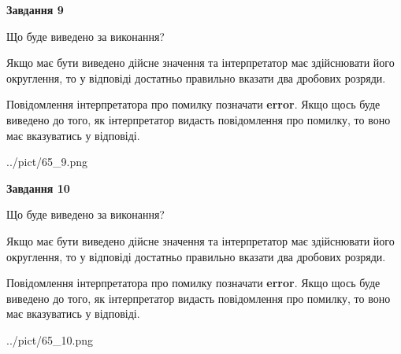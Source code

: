 \documentclass[12pt, ukrainian]{article}
\begin{document}
{\begin {Large}
{\begin {center}\textbf{Завдання 9}\end {center}}\par
Що буде виведено за виконання? \par

Якщо має бути виведено дійсне значення та інтерпретатор має здійснювати його округлення, 
то у відповіді достатньо правильно вказати два дробових розряди.

Повідомлення інтерпретатора про помилку позначати \textbf{error}.
Якщо щось буде виведено до того, як інтерпретатор видасть повідомлення про помилку, 
то воно має вказуватись у відповіді. \par

\begin{center}
	{../pict/65_9.png}
\end{center}
\newpage

{\begin {center}\textbf{Завдання 10}\end {center}}\par
Що буде виведено за виконання? \par

Якщо має бути виведено дійсне значення та інтерпретатор має здійснювати його округлення, 
то у відповіді достатньо правильно вказати два дробових розряди.

Повідомлення інтерпретатора про помилку позначати \textbf{error}.
Якщо щось буде виведено до того, як інтерпретатор видасть повідомлення про помилку, 
то воно має вказуватись у відповіді. \par

\begin{center}
	{../pict/65_10.png}
\end{center}
\newpage

\end {Large}}
\end{document}

